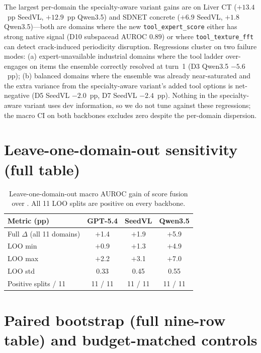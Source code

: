 The largest per-domain the specialty-aware variant gains are on Liver CT ($+13.4$~pp SeedVL, $+12.9$~pp Qwen3.5) and SDNET concrete ($+6.9$ SeedVL, $+1.8$ Qwen3.5)---both are domains where the new \texttt{tool\_expert\_score} either has strong native signal (D10 subspacead AUROC $0.89$) or where \texttt{tool\_texture\_fft} can detect crack-induced periodicity disruption. Regressions cluster on two failure modes: (a) expert-unavailable industrial domains where the tool ladder over-engages on items  the ensemble correctly resolved at turn~1 (D3 Qwen3.5 $-5.6$~pp); (b) balanced domains where  the ensemble was already near-saturated and the extra variance from the specialty-aware variant's added tool options is net-negative (D5 SeedVL $-2.0$~pp, D7 SeedVL $-2.4$~pp). Nothing in the specialty-aware variant uses dev information, so we do not tune against these regressions; the macro CI on both backbones excludes zero despite the per-domain dispersion.

\section{Leave-one-domain-out sensitivity (full table)}
\label{app:loo}

\begin{table}[h]
\centering
\caption{Leave-one-domain-out macro AUROC gain of score fusion over . All 11 LOO splits are positive on every backbone.}
\label{tab:loo}
\small
\begin{tabular}{lccc}
\toprule
Metric (pp) & GPT-5.4 & SeedVL & Qwen3.5 \\
\midrule
Full $\Delta$ (all 11 domains) & $+$1.4 & $+$1.9 & $+$5.9 \\
LOO min                        & $+$0.9 & $+$1.3 & $+$4.9 \\
LOO max                        & $+$2.2 & $+$3.1 & $+$7.0 \\
LOO std                        & 0.33   & 0.45   & 0.55   \\
Positive splits / 11           & 11 / 11 & 11 / 11 & 11 / 11 \\
\bottomrule
\end{tabular}
\end{table}

\section{Paired bootstrap (full nine-row table) and budget-matched controls}
\label{app:bootstrap}

